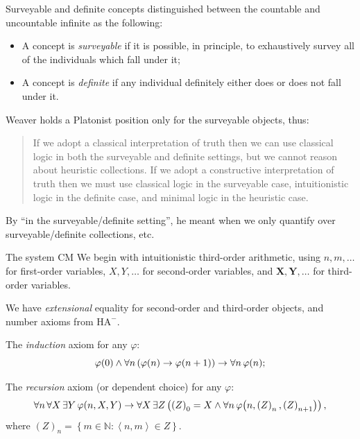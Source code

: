\documentclass{beamer}
\newcommand{\tuple}[1]{\left\langle #1 \right\rangle}
\newcommand{\highlight}[1]{{\usebeamercolor[fg]{frametitle}\emph{#1}}}
\begin{document}
\begin{frame}{Surveyable and definite concepts}
   distinguished between the countable and uncountable infinite as the following:
  \begin{itemize}
    \item A concept is \highlight{surveyable} if it is possible, in principle, to exhaustively survey all of the individuals which fall under it;
    \item A concept is \highlight{definite} if any individual definitely either does or does not fall under it.
  \end{itemize}

  \pause

  \vspace{0.6em}

  Weaver holds a Platonist position only for the surveyable objects, thus:
  \begin{quotation}
    If we adopt a classical interpretation of truth then we can use classical logic in both the surveyable and definite settings, but we cannot reason about heuristic collections. If we adopt a constructive interpretation of truth then we must use classical logic in the surveyable case, intuitionistic logic in the definite case, and minimal logic in the heuristic case. \cite{weaver09-set}
  \end{quotation}

  By ``in the surveyable/definite setting'', he meant when we only quantify over surveyable/definite collections, etc.
\end{frame}

\begin{frame}{The system $\mathrm{CM}$}
  We begin with intuitionistic third-order arithmetic, using $n, m, \ldots$ for first-order variables, $X, Y, \ldots$ for second-order variables, and $\mathbf{X}, \mathbf{Y}, \ldots$ for third-order variables.

  \vspace{0.6em}

  We have \emph{extensional} equality for second-order and third-order objects, and number axioms from $\mathrm{HA}^-$.

  \pause

  \vspace{0.6em}

  The \emph{induction} axiom for any $\varphi$:
  \[\varphi\mleft(0\mright) \land \forall n \left(\varphi\mleft(n\mright) \rightarrow \varphi\mleft(n + 1\mright)\right) \rightarrow \forall n \, \varphi\mleft(n\mright);\]

  The \emph{recursion} axiom (or dependent choice) for any $\varphi$:
  \[\forall n \, \forall X \, \exists Y \, \varphi\mleft(n, X, Y\mright) \rightarrow \forall X \, \exists Z \left(\left(Z\right)_0 = X \land \forall n \, \varphi\mleft(n, \left(Z\right)_n, \left(Z\right)_{n + 1}\mright)\right),\]
  where $\left(Z\right)_n = \left\{m \in \mathbb{N} : \tuple{n, m} \in Z\right\}$.
\end{frame}
\end{document}
